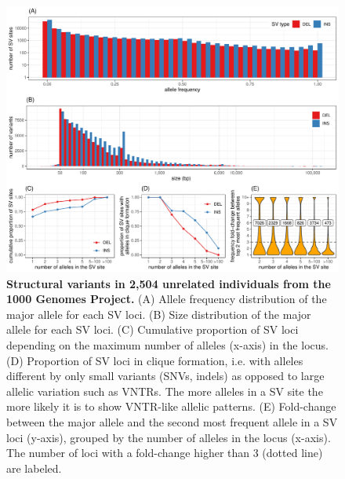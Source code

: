 \documentclass[11pt]{ucscthesis}
\begin{document}
\begin{figure}[H]
    \centering
    \includegraphics[width=\linewidth]{fig-sv-1kgp-stats.pdf}
    \caption[Structural variants in 2,504 unrelated individuals from the 1000 Genomes Project]{\textbf{Structural variants in 2,504 unrelated individuals from the 1000 Genomes Project.}
      (A) Allele frequency distribution of the major allele for each SV loci.
      (B) Size distribution of the major allele for each SV loci.
      (C) Cumulative proportion of SV loci depending on the maximum number of alleles (x-axis) in the locus.
      (D) Proportion of SV loci in clique formation, i.e. with alleles different by only small variants (SNVs, indels) as opposed to large allelic variation such as VNTRs.
      The more alleles in a SV site the more likely it is to show VNTR-like allelic patterns.
      (E) Fold-change between the major allele and the second most frequent allele in a SV loci (y-axis), grouped by the number of alleles in the locus (x-axis).
      The number of loci with a fold-change higher than 3 (dotted line) are labeled.
    }
    \label{fig:sv-1kgp-stats}
\end{figure}
\end{document}

